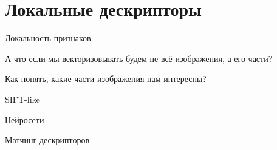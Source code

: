 \section{Локальные дескрипторы}


\begin{frame}{Локальность признаков}

А что если мы векторизовывать будем не всё изображения, а его части?

Как понять, какие части изображения нам интересны?
    
\end{frame}

\begin{frame}{SIFT-like}
    
\end{frame}

\begin{frame}{Нейросети}
    
\end{frame}

\begin{frame}{Матчинг дескрипторов}
    
\end{frame}
